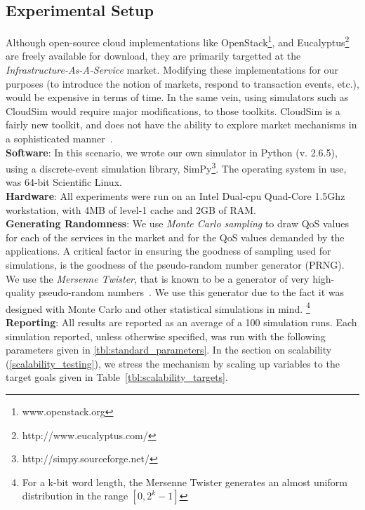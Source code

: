 \documentclass[10pt,journal,compsoc]{IEEEtran}
\begin{document}
\subsection{Experimental Setup}
Although open-source cloud implementations like OpenStack\footnote{www.openstack.org}, and Eucalyptus\footnote{http://www.eucalyptus.com/} are freely available for download, they are primarily targetted at the \textit{Infrastructure-As-A-Service} market. Modifying these implementations for our purposes (to introduce the notion of markets, respond to transaction events, etc.), would be expensive in terms of time. In the same vein, using simulators such as CloudSim would require major modifications, to those toolkits. CloudSim is a fairly new toolkit, and does not have the ability to explore market mechanisms in a sophisticated manner~\cite{Breskovic2011Towards}. \\
\textbf{Software}: In this scenario, we wrote our own simulator in Python (v. 2.6.5), using a discrete-event simulation library, SimPy\footnote{http://simpy.sourceforge.net/}. The operating system in use, was 64-bit Scientific Linux.\\
\textbf{Hardware}: All experiments were run on an Intel Dual-cpu Quad-Core 1.5Ghz workstation, with 4MB of level-1 cache and 2GB of RAM.\\
\textbf{Generating Randomness}: We use \textit{Monte Carlo sampling} to draw QoS values for each of the services in the market and for the QoS values demanded by the applications. A critical factor in ensuring the goodness of sampling used for simulations, is the goodness of the pseudo-random number generator (PRNG). We use the \textit{Mersenne Twister}, that is known to be a generator of very high-quality pseudo-random numbers~\cite{Matsumoto1998Mersenne}. We use this generator due to the fact it was designed with Monte Carlo and other statistical simulations in mind. \footnote{For a k-bit word length, the Mersenne Twister generates an almost uniform distribution in the range $[0, 2^{k} - 1]$} \\
\textbf{Reporting}: All results are reported as an average of a 100 simulation runs. Each simulation reported, unless otherwise specified, was run with the following parameters given in \autoref{tbl:standard_parameters}. In the section on scalability (\autoref{scalability_testing}), we stress the mechanism by scaling up variables to the target goals given in Table~\ref{tbl:scalability_targets}.
\end{document}
